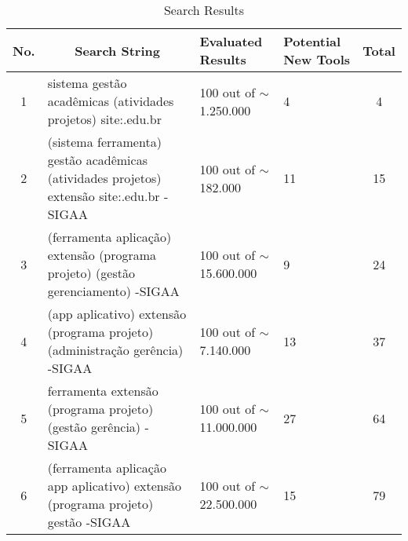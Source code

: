 \begin{table}
  \centering
  \caption{Search Results}
  \label{tbl:gl-search-results}
  \scriptsize
  \begin{tabular}{c|p{6cm}|l|p{1.5cm}|c}
    \bottomrule
    \rowcolor[rgb]{0.753,0.753,0.753} \textbf{No.} & \multicolumn{1}{c|}{\textbf{Search String}}                                                                                 & \textbf{Evaluated Results}  & \textcolor[rgb]{0.137,0.137,0.145}{\textbf{Potential New Tools}} & \textbf{Total} \\
    \hline
    \rowcolor[rgb]{0.898,0.898,0.898} 1            & sistema gestão acadêmicas (atividades \textbar{} projetos) site:.edu.br                                                     & 100 out of $\sim$1.250.000  & 4                                                                & 4              \\
    2                                              & (sistema \textbar{} ferramenta) gestão acadêmicas (atividades \textbar{} projetos) extensão site:.edu.br -SIGAA             & 100 out of $\sim$182.000    & 11                                                               & 15             \\
    \hhline{>{\arrayrulecolor[rgb]{0.898,0.898,0.898}}->{\arrayrulecolor{black}}->{\arrayrulecolor[rgb]{0.898,0.898,0.898}}---}
    \rowcolor[rgb]{0.898,0.898,0.898} 3            & (ferramenta \textbar{} aplicação) extensão (programa \textbar{} projeto) (gestão \textbar{} gerenciamento) -SIGAA           & 100 out of $\sim$15.600.000 & 9                                                                & 24             \\
    4                                              & (app \textbar{} aplicativo) extensão (programa \textbar{} projeto) (administração \textbar{} gerência) -SIGAA               & 100 out of $\sim$7.140.000  & 13                                                               & 37             \\
    \rowcolor[rgb]{0.898,0.898,0.898} 5            & ferramenta extensão (programa \textbar{} projeto) (gestão \textbar{} gerência) -SIGAA                                       & 100 out of $\sim$11.000.000 & 27                                                               & 64             \\
    6                                              & (ferramenta \textbar{} aplicação \textbar{} app \textbar{} aplicativo) extensão (programa \textbar{} projeto) gestão -SIGAA & 100 out of $\sim$22.500.000 & 15                                                               & 79             \\

\end{tabular}
\end{table}

